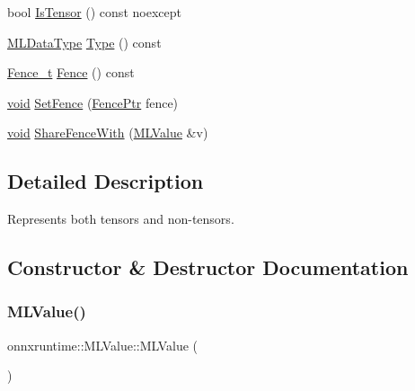 \begin{DoxyCompactItemize}
\item 
bool \mbox{\hyperlink{classonnxruntime_1_1MLValue_a82f40a677063136a312807bb47789c7d}{Is\+Tensor}} () const noexcept
\item 
\mbox{\hyperlink{namespaceonnxruntime_ad77d0a6e838ec7da5dc35fed5ee66b49}{M\+L\+Data\+Type}} \mbox{\hyperlink{classonnxruntime_1_1MLValue_a14fdb626b8331e8bda7e8a270d8dc9d6}{Type}} () const
\item 
\mbox{\hyperlink{namespaceonnxruntime_a71ef3c4da6339a3625cdf4c4937e4913}{Fence\+\_\+t}} \mbox{\hyperlink{classonnxruntime_1_1MLValue_aab8979a3d6e8aaa670da1eaed34ea72a}{Fence}} () const
\item 
\mbox{\hyperlink{mlasi_8h_a88f941d423cb2a819b70a1358982b1a6}{void}} \mbox{\hyperlink{classonnxruntime_1_1MLValue_a2d7142ee59477918df34c3a1a9fe3951}{Set\+Fence}} (\mbox{\hyperlink{namespaceonnxruntime_a42d52aa37e4dba8c02178f81eda99eeb}{Fence\+Ptr}} fence)
\item 
\mbox{\hyperlink{mlasi_8h_a88f941d423cb2a819b70a1358982b1a6}{void}} \mbox{\hyperlink{classonnxruntime_1_1MLValue_a8d2c7a667ef89c9eee27df039b62e027}{Share\+Fence\+With}} (\mbox{\hyperlink{classonnxruntime_1_1MLValue}{M\+L\+Value}} \&v)
\end{DoxyCompactItemize}


\subsection{Detailed Description}
Represents both tensors and non-\/tensors. 

\subsection{Constructor \& Destructor Documentation}
\mbox{\label{classonnxruntime_1_1MLValue_ae9ed3dcdbcf9a6189e4afca9f007652e}} 
\subsubsection{\texorpdfstring{M\+L\+Value()}{MLValue()}\hspace{0.1cm}{\footnotesize\ttfamily [1/2]}}
{\footnotesize\ttfamily onnxruntime\+::\+M\+L\+Value\+::\+M\+L\+Value (\begin{DoxyParamCaption}{ }\end{DoxyParamCaption})\hspace{0.3cm}{\ttfamily [inline]}}

